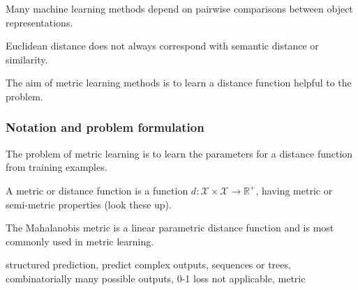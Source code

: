 Many machine learning methods depend on pairwise comparisons between object representations. 

Euclidean distance does not always correspond with semantic distance or similarity.

The aim of metric learning methods is to learn a distance function helpful to the problem.




\subsubsection{Notation and problem formulation}


The problem of metric learning is to learn the parameters for a distance function from training examples.

A metric or distance function is a function $d: \mathcal{X} \times \mathcal{X} \rightarrow \mathbb{R}^{+}$, having metric or semi-metric properties (look these up).

The Mahalanobis metric is a linear parametric distance function and is most commonly used in metric learning.



structured prediction, predict complex outputs, sequences or trees, combinatorially many possible outputs, 0-1 loss not applicable, metric 

